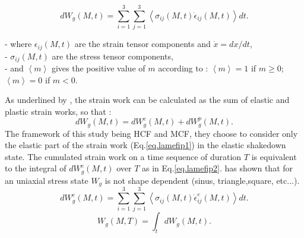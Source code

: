 $$dW_g(M,t)=\sum_{i=1}^{3}\sum_{j=1}^{3}\left\langle \sigma_{ij}\left( M,t\right)\dot{\epsilon}_{ij}\left( M,t \right)\right\rangle  dt .$$

\noindent
- where $\epsilon_{ij}\left( M,t\right)$ are the strain tensor components and $\dot{x}= dx/dt$,\\
- $\sigma_{ij}\left( M,t\right)$ are the stress tensor components,\\
- and $\left\langle m\right\rangle$ gives the positive value of $m$ according to : $\left\langle m\right\rangle=1$ if $m \geqslant 0$; $\left\langle m\right\rangle=0$  if $m < 0$.

As underlined by \cite{ellyin2012fatigue}, the strain work can be calculated as the sum of elastic and plastic strain works, so that :
$$dW_g(M,t)=dW_g^e(M,t)+dW_g^p(M,t).$$
The framework of this study being HCF and MCF, they choose to consider only the elastic part of the strain work (Eq.\eqref{eq.lamefip1}) in the elastic shakedown state. The cumulated strain work on a time
sequence of duration $T$ is equivalent to the integral of $dW_g^e(M,t)$ over $T$ as in Eq.\eqref{eq.lamefip2}. \cite{banvillet2003volumetric} has shown that for an uniaxial stress state $W_g$ is not shape dependent (sinus, triangle,square, etc...).
\begin{equation}
dW_g^e(M,t)=\sum_{i=1}^{3}\sum_{j=1}^{3}\left\langle\sigma_{ij}\left( M,t\right)\dot{\epsilon}_{ij}^e\left( M,t\right)\right\rangle dt .
\label{eq.lamefip1}
\end{equation}
\begin{equation}W_g(M,T)=\int_{t}dW_g(M,t).\label{eq.lamefip2}
\end{equation}

